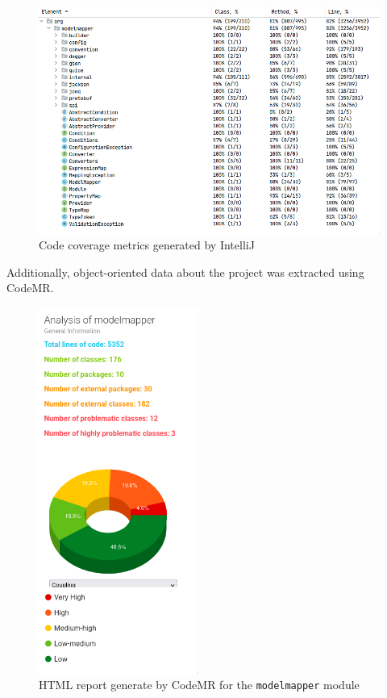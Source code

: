 \documentclass[12pt]{article}
\newcommand{\modelmapper}{\texttt{modelmapper}\xspace}
\begin{document}
\begin{figure}[H]
    \centering
    \includegraphics[width=14cm]{images/code-coverage.png}
    \caption{Code coverage metrics generated by IntelliJ}
    \label{intellij-code-coverage}
\end{figure}

Additionally, object-oriented data about the project was
extracted using CodeMR.

\begin{figure}[H]
    \centering
    \includegraphics[height=12cm]{images/codemr-metrics.png}
    \caption{HTML report generate by CodeMR for the \modelmapper
    module}
    \label{codemr-metrics}
\end{figure}
\end{document}
